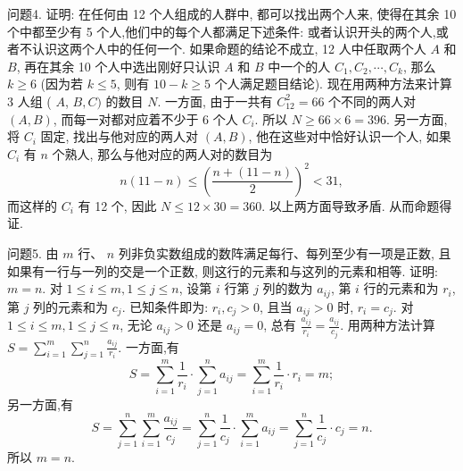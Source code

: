 问题4. 证明: 在任何由 12 个人组成的人群中, 都可以找出两个人来, 使得在其余 10 个中都至少有 5 个人,他们中的每个人都满足下述条件: 或者认识开头的两个人,或者不认识这两个人中的任何一个.
如果命题的结论不成立, 12 人中任取两个人 $A$ 和 $B$, 再在其余 10 个人中选出刚好只认识 $A$ 和 $B$ 中一个的人 $C_1, C_2, \cdots, C_k$, 那么 $k \geqslant 6$ (因为若 $k \leqslant 5$, 则有 $10-k \geqslant 5$ 个人满足题目结论). 现在用两种方法来计算 3 人组 ( $A$, $B, C)$ 的数目 $N$.
一方面, 由于一共有 $C_{12}^2=66$ 个不同的两人对 $(A, B)$, 而每一对都对应着不少于 6 个人 $C_i$. 所以 $N \geqslant 66 \times 6=396$.
另一方面, 将 $C_i$ 固定, 找出与他对应的两人对 $(A, B)$, 他在这些对中恰好认识一个人, 如果 $C_i$ 有 $n$ 个熟人, 那么与他对应的两人对的数目为
$$
n(11-n) \leqslant\left(\frac{n+(11-n)}{2}\right)^2<31,
$$
而这样的 $C_i$ 有 12 个, 因此 $N \leqslant 12 \times 30=360$.
以上两方面导致矛盾.
从而命题得证.



问题5. 由 $m$ 行、 $n$ 列非负实数组成的数阵满足每行、每列至少有一项是正数, 且如果有一行与一列的交是一个正数, 则这行的元素和与这列的元素和相等.
证明: $m=n$. 
对 $1 \leqslant i \leqslant m, 1 \leqslant j \leqslant n$, 设第 $i$ 行第 $j$ 列的数为 $a_{i j}$, 第 $i$ 行的元素和为 $r_i$, 第 $j$ 列的元素和为 $c_j$. 已知条件即为: $r_i, c_j>0$, 且当 $a_{i j}>0$ 时, $r_i=c_j$.
对 $1 \leqslant i \leqslant m, 1 \leqslant j \leqslant n$, 无论 $a_{i j}>0$ 还是 $a_{i j}=0$, 总有 $\frac{a_{i j}}{r_i}=\frac{a_{i j}}{c_j}$.
用两种方法计算 $S=\sum_{i=1}^m \sum_{j=1}^n \frac{a_{i j}}{r_i}$.
一方面,有
$$
S=\sum_{i=1}^m \frac{1}{r_i} \cdot \sum_{j=1}^n a_{i j}=\sum_{i=1}^m \frac{1}{r_i} \cdot r_i=m ;
$$
另一方面,有
$$
S=\sum_{j=1}^n \sum_{i=1}^m \frac{a_{i j}}{c_j}=\sum_{j=1}^n \frac{1}{c_j} \cdot \sum_{i=1}^m a_{i j}=\sum_{j=1}^n \frac{1}{c_j} \cdot c_j=n .
$$
所以 $m=n$.



